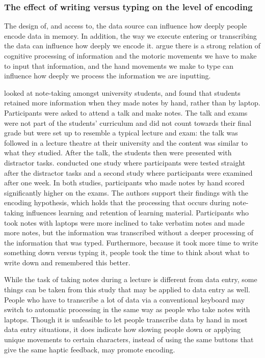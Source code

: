 \subsubsection{The effect of writing versus typing on the level of encoding}
The design of, and access to, the data source can influence how deeply people encode data in memory. In addition, the way we execute entering or transcribing the data can influence how deeply we encode it. \citet{Mangen2010} argue there is a strong relation of cognitive processing of information and the motoric movements we have to make to input that information, and the hand movements we make to type can influence how deeply we process the information we are inputting. 

\citet{Mueller2014} looked at note-taking amongst university students, and found that students retained more information when they made notes by hand, rather than by laptop. Participants were asked to attend a talk and make notes.
The talk and exams were not part of the students' curriculum and did not count towards their final grade but were set up to resemble a typical lecture and exam: the talk was followed in a lecture theatre at their university and the content was similar to what they studied. 
After the talk, the students then were presented with distractor tasks. 
\citet{Mueller2014} conducted one study where participants were tested straight after the distractor tasks and a second study where participants were examined after one week. 
In both studies, participants who made notes by hand scored significantly higher on the exams. The authors support their findings with the encoding hypothesis, which holds that the processing that occurs during note-taking influences learning and retention of learning material.  Participants who took notes with laptops were more inclined to take verbatim notes and made more notes, but the information was transcribed without a deeper processing of the information that was typed. 
Furthermore, because it took more time to write something down versus typing it, people took the time to think about what to write down and remembered this better.

While the task of taking notes during a lecture is different from data entry, some things can be taken from this study that may be applied to data entry as well. 
People who have to transcribe a lot of data via a conventional keyboard may switch to automatic processing in the same way as people who take notes with laptops. Though it is unfeasible to let people transcribe data by hand in most data entry situations, it does indicate how slowing people down or applying unique movements to certain characters, instead of using the same buttons that give the same haptic feedback, may promote encoding.

